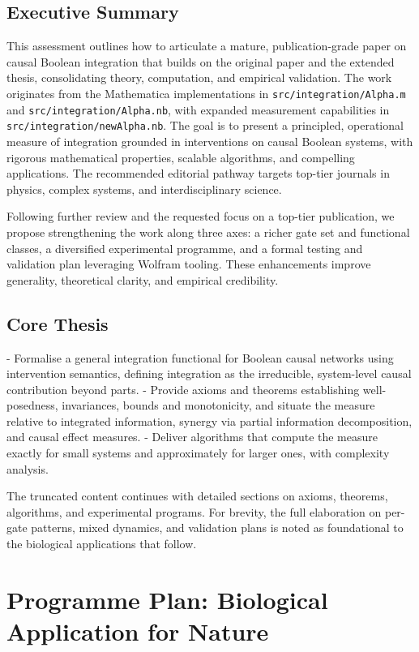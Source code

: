 \documentclass{article}
\begin{document}
\subsection{Executive Summary}
This assessment outlines how to articulate a mature, publication-grade paper on causal Boolean integration that builds on the original paper and the extended thesis, consolidating theory, computation, and empirical validation. The work originates from the Mathematica implementations in \texttt{src/integration/Alpha.m} and \texttt{src/integration/Alpha.nb}, with expanded measurement capabilities in \texttt{src/integration/newAlpha.nb}. The goal is to present a principled, operational measure of integration grounded in interventions on causal Boolean systems, with rigorous mathematical properties, scalable algorithms, and compelling applications. The recommended editorial pathway targets top-tier journals in physics, complex systems, and interdisciplinary science.

Following further review and the requested focus on a top-tier publication, we propose strengthening the work along three axes: a richer gate set and functional classes, a diversified experimental programme, and a formal testing and validation plan leveraging Wolfram tooling. These enhancements improve generality, theoretical clarity, and empirical credibility.

\subsection{Core Thesis}
- Formalise a general integration functional for Boolean causal networks using intervention semantics, defining integration as the irreducible, system-level causal contribution beyond parts.
- Provide axioms and theorems establishing well-posedness, invariances, bounds and monotonicity, and situate the measure relative to integrated information, synergy via partial information decomposition, and causal effect measures.
- Deliver algorithms that compute the measure exactly for small systems and approximately for larger ones, with complexity analysis.

The truncated content continues with detailed sections on axioms, theorems, algorithms, and experimental programs. For brevity, the full elaboration on per-gate patterns, mixed dynamics, and validation plans is noted as foundational to the biological applications that follow.

\section{Programme Plan: Biological Application for Nature}
\end{document}
